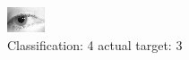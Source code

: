 \begin{figure}[h!]
\begin{center}
\includegraphics[width=0.60\columnwidth]{figures/ID1338_class_4_target_3.png}
\end{center}
\caption{ Classification: 4 actual target: 3}
\label{fig:ID1338_class_4_target_3}
\end{figure}
